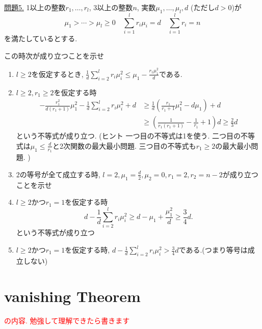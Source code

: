 \documentclass[dvipdfmx,a4paper,11pt]{article} %
\theoremstyle{definition}
\theoremstyle{remark}
\numberwithin{equation}{section}
\newcommand{\xr}[1]{\textcolor{red}{#1}}
\begin{document}
\underline{問題5.} 
1以上の整数$r_1, \ldots, r_l$, 3以上の整数$n$, 実数$\mu_1, \ldots, \mu_l, d$ (ただし$d>0$)が
\[
\mu_1 > \cdots > \mu_l \geq 0
\quad
\sum_{i=1}^{l}r_i\mu_i=d
\quad 
\sum_{i=1}^{l}r_i=n
\]
を満たしているとする. 

この時次が成り立つことを示せ
\begin{enumerate}
\item  $l\ge 2$を仮定するとき, $\frac{1}{d} \sum_{i=2}^{l}r_i \mu_i^2 \le \mu_1 - \frac{r_1 \mu_1^{2}}{d}$である.
\item $l \ge 2, r_1\ge 2$を仮定する時
\begin{align*}
-\frac{r_1^2}{d(r_1+1)}\mu_1^2
-\frac{1}{d} \sum_{i=2}^{l}r_i \mu_i^2
+d
&\ge
\frac{1}{d}\left(
\frac{r_1}{r_1+1}\mu_1^2
-
d\mu_1
\right)
+d
\\
&\ge
\left(
\frac{1}{r_1(r_1+1)}-\frac{1}{r_1}+1
\right)d
\ge \frac{2}{3}d
\end{align*}
という不等式が成り立つ. (ヒント 一つ目の不等式は1を使う. 二つ目の不等式は$\mu_1 \le \frac{d}{r_1}$と2次関数の最大最小問題. 三つ目の不等式も$r_1 \ge 2$の最大最小問題. )
\item 2の等号が全て成立する時, $l=2,\mu_1=\frac{d}{2}, \mu_2=0,r_1=2,r_2=n-2$が成り立つことを示せ
\item $l\ge 2$かつ$r_1=1$を仮定する時
$$
d
-
\frac{1}{d} \sum_{i=2}^{l}r_i \mu_i^2 
\geq
d-\mu_1+\frac{\mu_1^2}{d} \geq
\frac{3}{4}d .
$$
という不等式が成り立つ
\item $l\ge 2$かつ$r_1=1$を仮定する時, $d-\frac{1}{d} \sum_{i=2}^{l}r_i \mu_i^2 >\frac{3}{4}d $である.(つまり等号は成立しない) 
\end{enumerate}

\newpage

\section{vanishing Theorem}
\xr{\cite[3章]{Kob14}の内容. 勉強して理解できたら書きます} 
\end{document}

